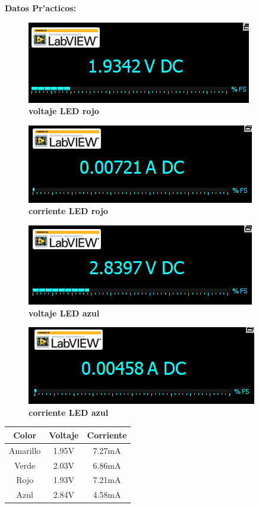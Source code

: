 \documentclass[11pt, letterpaper]{report}
\newcommand{\Center}[1]{
	\begin{center}
		#1
	\end{center}
} %
\newcommand{\Page}[3][c]{
	\begin{minipage}[#1]{#2\textwidth}
		#3
	\end{minipage}
}
\newenvironment{block}[1]{\hspace{-0.8 cm}\textbf{\Large #1}}{\vspace{3 mm}} %
\begin{document}
\begin{block}{Datos Pr'acticos:}
		\Page{.5}{
			\begin{figure}[H]
				\Center{
					\includegraphics[scale=.5]{vrojo.png}
					\caption{\textbf{voltaje LED rojo}}
				}
			\end{figure}
		}
		\Page{.5}{
			\begin{figure}[H]
				\Center{
					\includegraphics[scale=.5]{irojo.png}
					\caption{\textbf{corriente LED rojo}}
				}
			\end{figure}
		}
	
		\Page{.5}{
			\begin{figure}[H]
				\Center{
					\includegraphics[scale=.5]{vazul.png}
					\caption{\textbf{voltaje LED azul}}
				}
			\end{figure}
		}
		\Page{.5}{
			\begin{figure}[H]
				\Center{
					\includegraphics[scale=.5]{iazul.png}
					\caption{\textbf{corriente LED azul}}
				}
			\end{figure}
		}
	
	\vspace*{0.6cm}
	\Center{
		\LARGE
		\begin{tabular}{|ccc|}
			\hline
			\rowcolor{yellow}
			\textbf{Color}&\textbf{Voltaje}&\textbf{Corriente}\\
			\hline
			\hline
			Amarillo&1.95V&7.27mA\\\hline
			Verde&2.03V&6.86mA\\\hline
			Rojo&1.93V&7.21mA\\\hline
			Azul&2.84V&4.58mA\\\hline
		\end{tabular}
	}
	
	\end{block}
	
\end{document}
